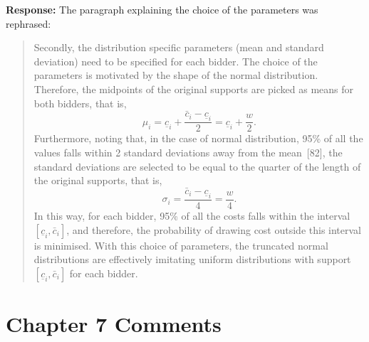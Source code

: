 \documentclass[10pt,a4paper,notitlepage]{article}
\numberwithin{equation}{section}
\begin{document}
\textbf{Response:}
The paragraph explaining the choice of the parameters was rephrased:
\begin{quote}
Secondly, the distribution specific parameters (mean and standard deviation) need to be specified for each bidder. The choice of the parameters is motivated by the shape of the normal distribution. Therefore, the midpoints of the original supports are picked as means for both bidders, that is,
\begin{equation}
\mu_i = \underline{c}_i + \frac{\bar{c}_i - \underline{c}_i}{2} = \underline{c}_i + \frac{w}{2}.
\end{equation}
Furthermore, noting that, in the case of normal distribution, 95\% of all the values falls within 2 standard deviations away from the mean~[82], the standard deviations are selected to be equal to the quarter of the length of the original supports, that is,
\begin{equation}
\sigma_i = \frac{\bar{c}_i - \underline{c}_i}{4} = \frac{w}{4}.
\end{equation}
In this way, for each bidder, 95\% of all the costs falls within the interval $[\underline{c}_i, \bar{c}_i]$, and therefore, the probability of drawing cost outside this interval is minimised. With this choice of parameters, the truncated normal distributions are effectively imitating uniform distributions with support $[\underline{c}_i, \bar{c}_i]$ for each bidder.
\end{quote}

\clearpage

\section{Chapter 7 Comments}
\end{document}
